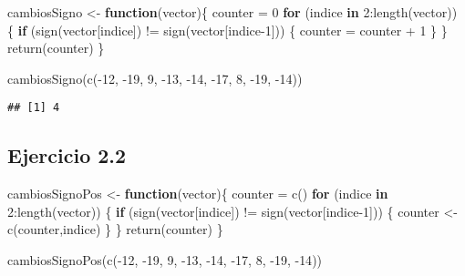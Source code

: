 \documentclass[
]{article}
\newenvironment{Shaded}{\begin{snugshade}}{\end{snugshade}}
\newcommand{\ControlFlowTok}[1]{\textcolor[rgb]{0.13,0.29,0.53}{\textbf{#1}}}
\newcommand{\DecValTok}[1]{\textcolor[rgb]{0.00,0.00,0.81}{#1}}
\newcommand{\FunctionTok}[1]{\textcolor[rgb]{0.00,0.00,0.00}{#1}}
\newcommand{\NormalTok}[1]{#1}
\newcommand{\OtherTok}[1]{\textcolor[rgb]{0.56,0.35,0.01}{#1}}
\newcommand{\SpecialCharTok}[1]{\textcolor[rgb]{0.00,0.00,0.00}{#1}}
\begin{document}
\begin{Shaded}
\begin{Highlighting}[]
\NormalTok{cambiosSigno }\OtherTok{\textless{}{-}} \ControlFlowTok{function}\NormalTok{(vector)\{}
\NormalTok{  counter }\OtherTok{=} \DecValTok{0}
  \ControlFlowTok{for}\NormalTok{ (indice }\ControlFlowTok{in} \DecValTok{2}\SpecialCharTok{:}\FunctionTok{length}\NormalTok{(vector)) \{}
    \ControlFlowTok{if}\NormalTok{ (}\FunctionTok{sign}\NormalTok{(vector[indice]) }\SpecialCharTok{!=} \FunctionTok{sign}\NormalTok{(vector[indice}\DecValTok{{-}1}\NormalTok{])) \{}
\NormalTok{      counter }\OtherTok{=}\NormalTok{ counter }\SpecialCharTok{+} \DecValTok{1}
\NormalTok{    \}}
\NormalTok{  \}}
  \FunctionTok{return}\NormalTok{(counter)}
\NormalTok{\}}

\FunctionTok{cambiosSigno}\NormalTok{(}\FunctionTok{c}\NormalTok{(}\SpecialCharTok{{-}}\DecValTok{12}\NormalTok{, }\SpecialCharTok{{-}}\DecValTok{19}\NormalTok{, }\DecValTok{9}\NormalTok{, }\SpecialCharTok{{-}}\DecValTok{13}\NormalTok{, }\SpecialCharTok{{-}}\DecValTok{14}\NormalTok{, }\SpecialCharTok{{-}}\DecValTok{17}\NormalTok{, }\DecValTok{8}\NormalTok{, }\SpecialCharTok{{-}}\DecValTok{19}\NormalTok{, }\SpecialCharTok{{-}}\DecValTok{14}\NormalTok{))}
\end{Highlighting}
\end{Shaded}

\begin{verbatim}
## [1] 4
\end{verbatim}

\hypertarget{ejercicio-2.2}{%
\subsection{Ejercicio 2.2}\label{ejercicio-2.2}}

\begin{Shaded}
\begin{Highlighting}[]
\NormalTok{cambiosSignoPos }\OtherTok{\textless{}{-}} \ControlFlowTok{function}\NormalTok{(vector)\{}
\NormalTok{  counter }\OtherTok{=} \FunctionTok{c}\NormalTok{()}
  \ControlFlowTok{for}\NormalTok{ (indice }\ControlFlowTok{in} \DecValTok{2}\SpecialCharTok{:}\FunctionTok{length}\NormalTok{(vector)) \{}
    \ControlFlowTok{if}\NormalTok{ (}\FunctionTok{sign}\NormalTok{(vector[indice]) }\SpecialCharTok{!=} \FunctionTok{sign}\NormalTok{(vector[indice}\DecValTok{{-}1}\NormalTok{])) \{}
\NormalTok{      counter }\OtherTok{\textless{}{-}} \FunctionTok{c}\NormalTok{(counter,indice)}
\NormalTok{    \}}
\NormalTok{  \}}
  \FunctionTok{return}\NormalTok{(counter)}
\NormalTok{\}}

\FunctionTok{cambiosSignoPos}\NormalTok{(}\FunctionTok{c}\NormalTok{(}\SpecialCharTok{{-}}\DecValTok{12}\NormalTok{, }\SpecialCharTok{{-}}\DecValTok{19}\NormalTok{, }\DecValTok{9}\NormalTok{, }\SpecialCharTok{{-}}\DecValTok{13}\NormalTok{, }\SpecialCharTok{{-}}\DecValTok{14}\NormalTok{, }\SpecialCharTok{{-}}\DecValTok{17}\NormalTok{, }\DecValTok{8}\NormalTok{, }\SpecialCharTok{{-}}\DecValTok{19}\NormalTok{, }\SpecialCharTok{{-}}\DecValTok{14}\NormalTok{))}
\end{Highlighting}
\end{Shaded}
\end{document}
